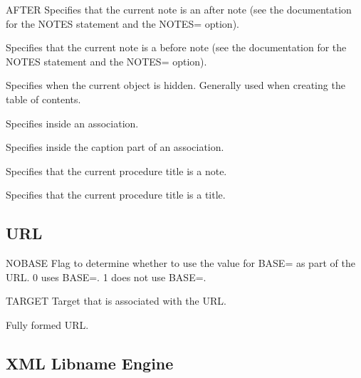 \begin{description}

AFTER	 Specifies that the current note is an after note (see the documentation for the NOTES statement and the NOTES= option).

Specifies that the current note is a before note (see the documentation for the NOTES statement and the NOTES= option).

Specifies when the current object is hidden. Generally used when creating the table of contents.

Specifies inside an association.

Specifies inside the caption part of an association.

Specifies that the current procedure title is a note.

Specifies that the current procedure title is a title.

\end{description}

\subsection{URL}

\begin{description}

NOBASE	Flag to determine whether to use the value for BASE= as part of the URL. 0 uses BASE=. 1 does not use BASE=.

TARGET	Target that is associated with the URL.

Fully formed URL.

\end{description}

\subsection{XML Libname Engine}

